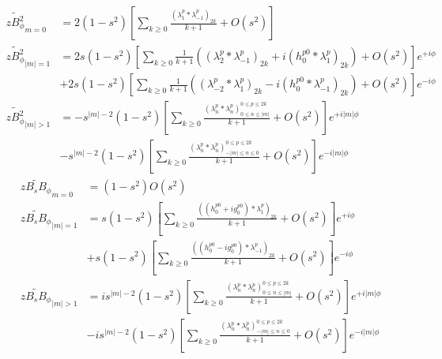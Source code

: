 \documentclass[a4paper, 11pt]{article}
\begin{document}
\begin{equation}
    \begin{aligned}
        \widetilde{zB_\phi^2}_{m=0} &= 2\left(1 - s^2\right) \left[\sum_{k\geq 0} \frac{(\lambda_1^p * \lambda_{-1}^p)_{2k}}{k+1} + O\left(s^2\right)\right] \\ 
        \widetilde{zB_\phi^2}_{|m|=1} &= 2 s \left(1 - s^2\right) \left[\sum_{k\geq 0} \frac{1}{k+1} \left((\lambda_2^p * \lambda_{-1}^p)_{2k} + i (h_0^{p0} * \lambda_{1}^p)_{2k}\right) + O\left(s^2\right)\right] e^{+i\phi} \\ 
        &+ 2 s \left(1 - s^2\right) \left[\sum_{k\geq 0} \frac{1}{k+1} \left((\lambda_{-2}^p * \lambda_{1}^p)_{2k} - i(h_0^{p0} * \lambda_{-1}^p)_{2k}\right) + O\left(s^2\right)\right] e^{-i\phi} \\
        \widetilde{zB_\phi^2}_{|m|>1} &= -s^{|m|-2} \left(1 - s^2\right) \left[\sum_{k\geq 0} \frac{(\lambda_n^p * \lambda_{n}^p)_{0\leq n \leq |m|}^{0\leq p \leq 2k}}{k+1} + O\left(s^2\right)\right] e^{+i|m|\phi} \\ 
        &- s^{|m|-2} \left(1 - s^2\right) \left[\sum_{k\geq 0} \frac{(\lambda_n^p * \lambda_{n}^p)_{-|m|\leq n \leq 0}^{0\leq p \leq 2k}}{k+1} + O\left(s^2\right)\right] e^{-i|m|\phi}
    \end{aligned}
\end{equation}
\begin{equation}
    \begin{aligned}
        \widetilde{zB_s B_\phi}_{m=0} &= \left(1 - s^2\right) O\left(s^2\right) \\ 
        \widetilde{zB_s B_\phi}_{|m|=1} &= s \left(1 - s^2\right) \left[\sum_{k\geq 0} \frac{((h_0^{p0} + ig_0^{p0}) * \lambda_{1}^p)_{2k}}{k+1} + O\left(s^2\right)\right] e^{+i\phi} \\ 
        &+ s \left(1 - s^2\right) \left[\sum_{k\geq 0} \frac{((h_0^{p0} - ig_0^{p0}) * \lambda_{-1}^p)_{2k}}{k+1} + O\left(s^2\right)\right] e^{-i\phi} \\
        \widetilde{zB_s B_\phi}_{|m|>1} &= i s^{|m|-2} \left(1 - s^2\right) \left[\sum_{k\geq 0} \frac{(\lambda_n^p * \lambda_{n}^p)_{0\leq n \leq |m|}^{0\leq p \leq 2k}}{k+1} + O\left(s^2\right)\right] e^{+i|m|\phi} \\ 
        &- is^{|m|-2} \left(1 - s^2\right) \left[\sum_{k\geq 0} \frac{(\lambda_n^p * \lambda_{n}^p)_{-|m|\leq n \leq 0}^{0\leq p \leq 2k}}{k+1} + O\left(s^2\right)\right] e^{-i|m|\phi}
    \end{aligned}
\end{equation}
\end{document}
